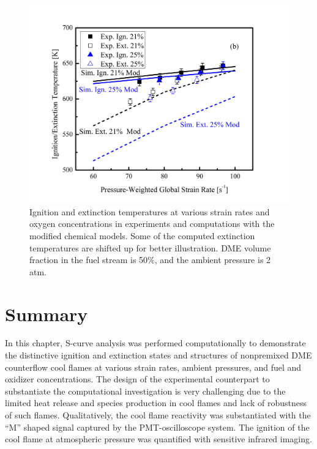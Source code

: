 \begin{figure}[t]
  \centering
  \scriptsize
  \includegraphics[width=1.0\textwidth]{ch-NTC/cmp_O2_mod.png}
  \normalsize
  \caption{Ignition and extinction temperatures at various strain rates and oxygen concentrations in experiments and computations with the modified chemical models.  Some of the computed extinction temperatures are shifted up for better illustration.  DME volume fraction in the fuel stream is 50\%, and the ambient pressure is 2 atm.}
  \label{fig:cmp_O2_mod}
\end{figure}

\section{Summary}

In this chapter, S-curve analysis was performed computationally to demonstrate the distinctive ignition and extinction states and structures of nonpremixed DME counterflow cool flames at various strain rates, ambient pressures, and fuel and oxidizer concentrations.  The design of the experimental counterpart to substantiate the computational investigation is very challenging due to the limited heat release and species production in cool flames and lack of robustness of such flames.  Qualitatively, the cool flame reactivity was substantiated with the ``M'' shaped signal captured by the PMT-oscilloscope system.  The ignition of the cool flame at atmospheric pressure was quantified with sensitive infrared imaging.  

